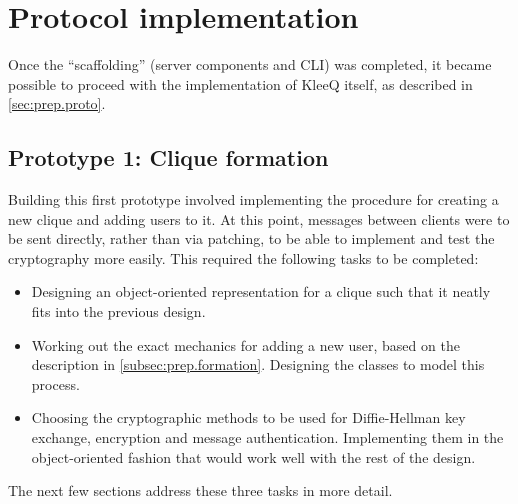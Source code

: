 \documentclass[a4paper, twoside, 12pt]{report}
\begin{document}
\section{Protocol implementation}
\label{sec:impl.proto}
Once the ``scaffolding'' (server components and CLI) was completed, it became possible to proceed with the implementation of KleeQ itself, as described in \cref{sec:prep.proto}.


\subsection{Prototype 1: Clique formation}
\label{subsec:impl.proto.formation}
Building this first prototype involved implementing the procedure for creating a new clique and adding users to it. At this point, messages between clients were to be sent directly, rather than via patching, to be able to implement and test the cryptography more easily. This required the following tasks to be completed:

\begin{itemize}
    \item Designing an object-oriented representation for a clique such that it neatly fits into the previous design.
    \item Working out the exact mechanics for adding a new user, based on the description in \cref{subsec:prep.formation}. Designing the classes to model this process.
    \item Choosing the cryptographic methods to be used for Diffie-Hellman key exchange, encryption and message authentication. Implementing them in the object-oriented fashion that would work well with the rest of the design.
\end{itemize}

The next few sections address these three tasks in more detail.
\end{document}
